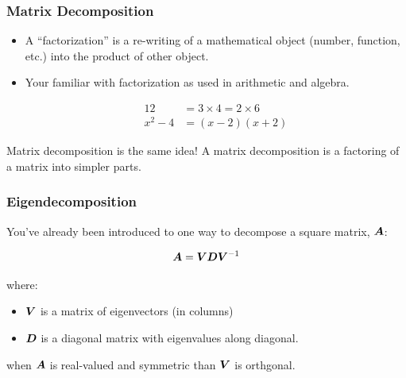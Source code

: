 \documentclass{beamer}
\begin{document}
\begin{frame}[fragile]
  \frametitle{Matrix Decomposition}

\begin{itemize}
\item A ``factorization'' is a re-writing of a mathematical object (number, function, etc.) into the product of other object.

\item Your familiar with factorization as used in arithmetic and algebra.

\begin{align*}
12 &= 3 \times 4 = 2 \times 6  \\
x^2 - 4 &= (x-2)(x+2)
\end{align*}

\end{itemize}




\begin{center}
 \alert{Matrix decomposition is the same idea! A matrix decomposition is a factoring of a matrix into simpler parts.}
\end{center}




\end{frame}



\begin{frame}
  \frametitle{Eigendecomposition}


You've already been introduced to one way to decompose a square matrix, $\bm{A}$:

$$ \bm{A} = \bm{V}\bm{D}\bm{V}^{-1} $$

where:
\begin{itemize}
\item  $\bm{V}$ is a matrix of eigenvectors (in columns)
\item $\bm{D}$ is a diagonal matrix with eigenvalues along diagonal.
\end{itemize}

\medskip
when $\bm{A}$ is real-valued and symmetric than $\bm{V}$ is orthgonal.

\end{frame}

\end{document}
